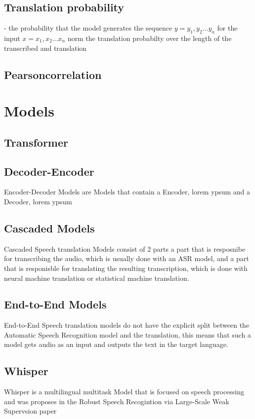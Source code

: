 \subsection{Translation probability}
- the probability that the model generates the sequence $y = y_1, y_2 \dots y_n$ for the input $x=x_1, x_2 \dots x_n$
norm the translation probabilty over the length of the transcribed and translation 
\subsection{Pearsoncorrelation}

\section{Models}
\subsection{Transformer}
\subsection{Decoder-Encoder}
Encoder-Decoder Models are Models that contain a Encoder, lorem ypsum 
and a Decoder, lorem ypsum


\subsection{ Cascaded Models}
Cascaded Speech translation Models consist of 2 parts a part that is resposnibe for transcribing the audio, which is usually done with an ASR model, and a part that is responisble for translating the resulting transcription, which is done with neural machine translation or statistical machine translation. 
\subsection{End-to-End Models}
End-to-End Speech translation models do not have the explicit split between the Automatic Speech Recognition model and the translation, this means that such a model gets audio as an input and outputs the text in the target language. 
\subsection{Whisper}
Whisper is a multilingual multitask Model that is focused on speech processing and was proposes in the Robust Speech Recogintion via Large-Scale Weak Supervsion paper \cite{radford2022robust} 
